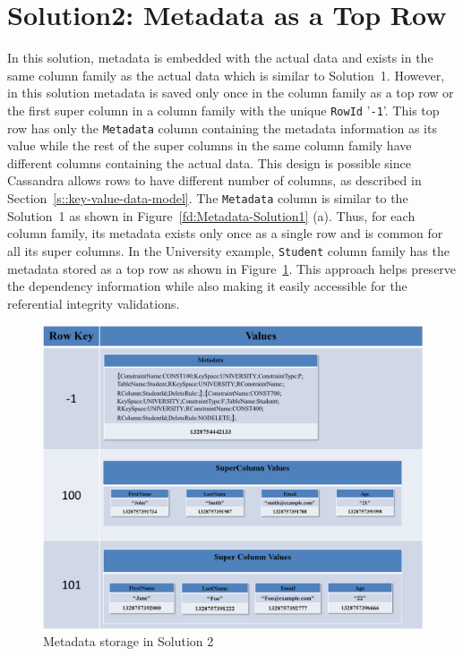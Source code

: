 
\section{Solution2:  Metadata as a Top Row} \label{s:design-sol2}


In this solution,   metadata is embedded with the actual data and exists in the
same column family as the actual data which is similar to Solution~1. 
However,  in this solution   metadata is saved only once in the column family as
a top row or the first super column in a column family with the unique
\texttt{RowId} '\texttt{-1}'.  This top row has only the \texttt{Metadata} 
column containing the metadata information as its value while the rest of the
super columns in the same column family have different columns containing the
actual data.  This design is possible since Cassandra allows rows to have
different number of columns,  as described in
Section~\ref{s::key-value-data-model}.  The \texttt{Metadata} column is similar
to the Solution~1 as shown in Figure~\ref{fd:Metadata-Solution1} (a).  Thus,  for
each column family,  its metadata exists only once as a single row and is common
for all its super columns.  In the University example,   \texttt{Student} column
family has the metadata  stored as a top row as  shown in
Figure~\ref{fd:Metadata-Solution2}.  This approach helps preserve the dependency
information while also making it easily accessible for the referential integrity 
validations. 
		 
	\begin{figure}[h]  
		\centering 
		\includegraphics[width=.8\textwidth]{./figure/Solutions/Sol2-MD-ColumnFamily.png}
		\caption{Metadata storage in Solution 2}\label{fd:Metadata-Solution2}
	\end{figure}
		
